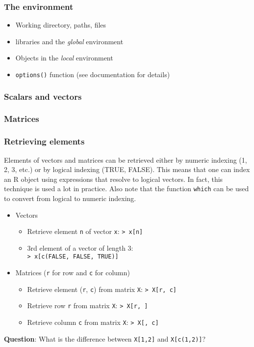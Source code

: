 \documentclass{beamer}
\begin{document}
\begin{frame}[fragile]
    \frametitle{The environment}
    \begin{itemize}
      \item Working directory, paths, files
      \item libraries and the \emph{global} environment
      \item Objects in the \emph{local} environment
      \item \texttt{options()} function (see documentation for details)
    \end{itemize}
    
\end{frame}


\begin{frame}[fragile]
    \frametitle{Scalars and vectors}
    
\end{frame}


\begin{frame}[fragile]
    \frametitle{Matrices}
    
\end{frame}


\begin{frame}
    \frametitle{Retrieving elements}
    Elements of vectors and matrices can be retrieved either by numeric indexing (1, 2, 3, etc.)
    or by logical indexing (TRUE, FALSE).
    This means that one can index an R object using expressions that resolve to logical vectors.
    In fact, this technique is used a lot in practice.
    Also note that the function \texttt{which} can be used to convert from logical to numeric indexing.
    \begin{itemize}
      \item Vectors
        \begin{itemize}
          \item Retrieve element \texttt{n} of vector \texttt{x}: \texttt{> x[n]}
          \item 3rd element of a vector of length 3:\\ \texttt{> x[c(FALSE, FALSE, TRUE)]}
        \end{itemize}
      \item Matrices (\texttt{r} for row and \texttt{c} for column)
        \begin{itemize}
          \item Retrieve element (\texttt{r}, \texttt{c}) from matrix \texttt{X}: \texttt{> X[r, c]}
          \item Retrieve row \texttt{r} from matrix \texttt{X}: \texttt{> X[r, ]}
          \item Retrieve column \texttt{c} from matrix \texttt{X}: \texttt{> X[, c]}
        \end{itemize}
    \end{itemize}
    \textbf{Question}: What is the difference between \texttt{X[1,2]} and \texttt{X[c(1,2)]}?
\end{frame}
\end{document}
